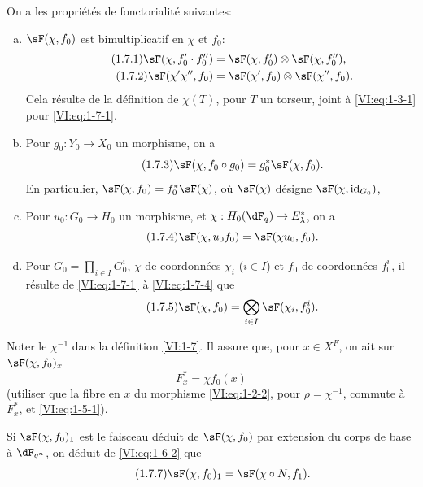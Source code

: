 On a les propriétés de fonctorialité suivantes:
\begin{enumerate}[a)]
  \item $\sF(\chi,f_0)$ est bimultiplicatif en $\chi$ et $f_0$: 
    \begin{align*}\tag{1.7.1}\label{VI:eq:1-7-1}
      \sF(\chi,f_0'\cdot f_0'') &= \sF(\chi,f_0')\otimes \sF(\chi,f_0'') \text{,} \\
      \tag{1.7.2}\label{VI:eq:1-7-2}
      \sF(\chi'\chi'',f_0) &= \sF(\chi',f_0)\otimes \sF(\chi'',f_0) \text{.}
    \end{align*}
Cela résulte de la définition de $\chi(T)$, pour $T$ un torseur, joint 
    à \eqref{VI:eq:1-3-1} pour \eqref{VI:eq:1-7-1}. 
  \item Pour $g_0:Y_0\to X_0$ un morphisme, on a 
    \begin{equation*}\tag{1.7.3}\label{VI:eq:1-7-3}
      \sF(\chi,f_0\circ g_0) = g_0^\ast \sF(\chi,f_0) \text{.}
    \end{equation*}
    En particulier, $\sF(\chi,f_0) = f_0^\ast \sF(\chi)$, où $\sF(\chi)$ 
    désigne $\sF(\chi,\operatorname{id}_{G_0})$, 
  \item Pour $u_0:G_0\to H_0$ un morphisme, et 
    $\chi:H_0(\dF_q) \to E_\lambda^\ast$, on a 
    \begin{equation*}\tag{1.7.4}\label{VI:eq:1-7-4}
      \sF(\chi,u_0 f_0) = \sF(\chi u_0,f_0) \text{.}
    \end{equation*}
  \item Pour $G_0=\prod_{i\in I} G_0^i$, $\chi$ de coordonnées $\chi_i$ 
    ($i\in I$) et $f_0$ de coordonnées $f_0^i$, il résulte de 
    \eqref{VI:eq:1-7-1} à \eqref{VI:eq:1-7-4} que 
    \begin{equation*}\tag{1.7.5}\label{VI:eq:1-7-5}
      \sF(\chi,f_0) = \bigotimes_{i\in I} \sF(\chi_i,f_0^i) \text{.}
    \end{equation*}    
\end{enumerate}

Noter le $\chi^{-1}$ dans la définition \ref{VI:1-7}. Il assure que, pour 
$x\in X^F$, on ait sur $\sF(\chi,f_0)_x$ 
\begin{equation*}\tag{1.7.6}\label{VI:eq:1-7-6}
  F_x^\ast = \chi f_0(x)
\end{equation*}
(utiliser que la fibre en $x$ du morphisme \eqref{VI:eq:1-2-2}, pour 
$\rho=\chi^{-1}$, commute à $F_x^\ast$, et \eqref{VI:eq:1-5-1}). 

Si $\sF(\chi,f_0)_1$ est le faisceau déduit de $\sF(\chi,f_0)$ par extension 
du corps de base à $\dF_{q^n}$, on déduit de \eqref{VI:eq:1-6-2} que 
\begin{equation*}\tag{1.7.7}\label{VI:eq:1-7-7}
  \sF(\chi,f_0)_1 = \sF(\chi\circ N,f_1) \text{.}
\end{equation*}





